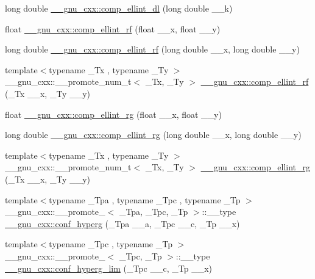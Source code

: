 \begin{DoxyCompactItemize}
\item 
long double \hyperlink{group__gnu__math__spec__func_ga494931ec0a271b79f1fdcfdf929e3138}{\+\_\+\+\_\+gnu\+\_\+cxx\+::comp\+\_\+ellint\+\_\+dl} (long double \+\_\+\+\_\+k)
\item 
float \hyperlink{group__gnu__math__spec__func_ga55ae30b4f8ff15017d18a80050e14e38}{\+\_\+\+\_\+gnu\+\_\+cxx\+::comp\+\_\+ellint\+\_\+rf} (float \+\_\+\+\_\+x, float \+\_\+\+\_\+y)
\item 
long double \hyperlink{group__gnu__math__spec__func_gae1d468487f1711e91719a9c6392f3c35}{\+\_\+\+\_\+gnu\+\_\+cxx\+::comp\+\_\+ellint\+\_\+rf} (long double \+\_\+\+\_\+x, long double \+\_\+\+\_\+y)
\item 
{\footnotesize template$<$typename \+\_\+\+Tx , typename \+\_\+\+Ty $>$ }\\\+\_\+\+\_\+gnu\+\_\+cxx\+::\+\_\+\+\_\+promote\+\_\+num\+\_\+t$<$ \+\_\+\+Tx, \+\_\+\+Ty $>$ \hyperlink{group__gnu__math__spec__func_ga98dd868dcb97e26971dfa8ac4db24df3}{\+\_\+\+\_\+gnu\+\_\+cxx\+::comp\+\_\+ellint\+\_\+rf} (\+\_\+\+Tx \+\_\+\+\_\+x, \+\_\+\+Ty \+\_\+\+\_\+y)
\item 
float \hyperlink{group__gnu__math__spec__func_ga978f8eec6e5edc918b243925dbacb65b}{\+\_\+\+\_\+gnu\+\_\+cxx\+::comp\+\_\+ellint\+\_\+rg} (float \+\_\+\+\_\+x, float \+\_\+\+\_\+y)
\item 
long double \hyperlink{group__gnu__math__spec__func_gaca5fa8ee8125afc8f35ec6b27806e873}{\+\_\+\+\_\+gnu\+\_\+cxx\+::comp\+\_\+ellint\+\_\+rg} (long double \+\_\+\+\_\+x, long double \+\_\+\+\_\+y)
\item 
{\footnotesize template$<$typename \+\_\+\+Tx , typename \+\_\+\+Ty $>$ }\\\+\_\+\+\_\+gnu\+\_\+cxx\+::\+\_\+\+\_\+promote\+\_\+num\+\_\+t$<$ \+\_\+\+Tx, \+\_\+\+Ty $>$ \hyperlink{group__gnu__math__spec__func_ga2c65744cf12dc54d7176258f791a87da}{\+\_\+\+\_\+gnu\+\_\+cxx\+::comp\+\_\+ellint\+\_\+rg} (\+\_\+\+Tx \+\_\+\+\_\+x, \+\_\+\+Ty \+\_\+\+\_\+y)
\item 
{\footnotesize template$<$typename \+\_\+\+Tpa , typename \+\_\+\+Tpc , typename \+\_\+\+Tp $>$ }\\\+\_\+\+\_\+gnu\+\_\+cxx\+::\+\_\+\+\_\+promote\+\_$<$ \+\_\+\+Tpa, \+\_\+\+Tpc, \+\_\+\+Tp $>$\+::\+\_\+\+\_\+type \hyperlink{group__gnu__math__spec__func_ga2e17ccbbc4cbb99c987e875531d4a3de}{\+\_\+\+\_\+gnu\+\_\+cxx\+::conf\+\_\+hyperg} (\+\_\+\+Tpa \+\_\+\+\_\+a, \+\_\+\+Tpc \+\_\+\+\_\+c, \+\_\+\+Tp \+\_\+\+\_\+x)
\item 
{\footnotesize template$<$typename \+\_\+\+Tpc , typename \+\_\+\+Tp $>$ }\\\+\_\+\+\_\+gnu\+\_\+cxx\+::\+\_\+\+\_\+promote\+\_$<$ \+\_\+\+Tpc, \+\_\+\+Tp $>$\+::\+\_\+\+\_\+type \hyperlink{group__gnu__math__spec__func_gab923b5a9e67469a5145d7bfcb20b3396}{\+\_\+\+\_\+gnu\+\_\+cxx\+::conf\+\_\+hyperg\+\_\+lim} (\+\_\+\+Tpc \+\_\+\+\_\+c, \+\_\+\+Tp \+\_\+\+\_\+x)

\end{DoxyCompactItemize}
